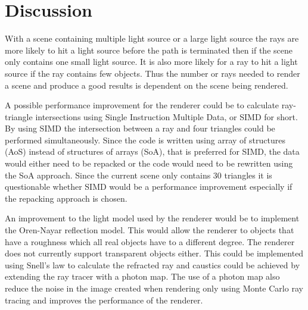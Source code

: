 \documentclass[twocolumn]{article}
\begin{document}
\section{Discussion}
With a scene containing multiple light source or a large light source the rays are more likely to hit a light source before the path is terminated then if the scene only contains one small light source. It is also more likely for a ray to hit a light source if the ray contains few objects. Thus the number or rays needed to render a scene and produce a good results is dependent on the scene being rendered.

A possible performance improvement for the renderer could be to calculate ray-triangle intersections using Single Instruction Multiple Data, or SIMD for short. By using SIMD the intersection between a ray and four triangles could be performed simultaneously. Since the code is written using array of structures (AoS) instead of structures of arrays (SoA), that is preferred for SIMD, the data would either need to be repacked or the code would need to be rewritten using the SoA approach. Since the current scene only contains 30 triangles it is questionable whether SIMD would be a performance improvement especially if the repacking approach is chosen.

An improvement to the light model used by the renderer would be to implement the Oren-Nayar reflection model. This would allow the renderer to objects that have a roughness which all real objects have to a different degree. The renderer does not currently support transparent objects either. This could be implemented using Snell's law to calculate the refracted ray and caustics could be achieved by extending the ray tracer with a photon map. The use of a photon map also reduce the noise in the image created when rendering only using Monte Carlo ray tracing and improves the performance of the renderer.

\newpage
\printbibliography
\end{document}
